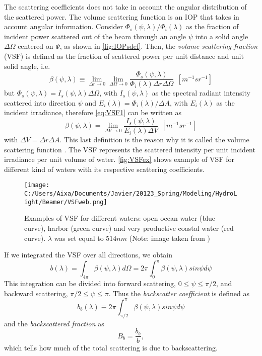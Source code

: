 The scattering coefficients does not take in account the angular distribution of the scattered power. The volume scattering function is an IOP that takes in account angular information. Consider $\Phi_s(\psi,\lambda)/\Phi_i(\lambda)$ as the fraction of incident power scattered out of the beam through an angle $\psi$ into a solid angle $\Delta\Omega$ centered on $\Psi$, as shown in \autoref{fig:IOPsdef}. Then, the {\it volume scattering fraction} (VSF)  is defined as the fraction of scattered power per unit distance and unit solid angle, i.e.
\begin{equation}\label{eq:VSF1}
  \beta(\psi,\lambda)\equiv \lim_{\Delta r\to 0} \lim_{\Delta \Omega\to 0}  \frac{\Phi_s(\psi,\lambda)}{\Phi_i(\lambda)\Delta r\Delta \Omega}~~\left[m^{-1}sr^{-1} \right]
\end{equation}
but $\Phi_s(\psi,\lambda)=I_s(\psi,\lambda)\Delta \Omega$, with $I_s(\psi,\lambda)$ as the spectral radiant intensity scattered into direction $\psi$ and $E_i(\lambda)=\Phi_i(\lambda)/\Delta A$, with $E_i(\lambda)$ as the incident irradiance, therefore \autoref{eq:VSF1} can be written as
\begin{equation} 
  \beta(\psi,\lambda)= \lim_{\Delta V\to 0} \frac{I_s(\psi,\lambda)}{E_i(\lambda)\Delta V}~~\left[m^{-1}sr^{-1} \right]
\end{equation}
with $\Delta V=\Delta r\Delta A$. This last definition is the reason why it is called the volume scattering function \cite{Mobley:2001}. The VSF represents the scattered intensity per unit incident irradiance per unit volume of water. \autoref{fig:VSFex} shows example of VSF for different kind of waters with its respective scattering coefficients.

\begin{figure}[htb]
\centering
      \texttt{[image: C:/Users/Aixa/Documents/Javier/20123\_Spring/Modeling/HydroLight/Beamer/VSFweb.png]}
      \caption{Examples of VSF for different waters: open ocean water (blue curve), harbor (green curve) and very productive coastal water (red curve). $\lambda$ was set equal to $514nm$ (Note: image taken from \cite{Mobley:2001})}
      \label{fig:VSFex}
\end{figure}

If we integrated the VSF over all directions, we obtain
\begin{equation}
  b(\lambda)=\int_{4\pi} \beta(\psi,\lambda)d\Omega=2\pi\int_0^\pi \beta(\psi,\lambda)sin\psi d\psi
\end{equation}
This integration can be divided into forward scattering, $0\leq\psi\leq\pi/2$, and backward scattering, $\pi/2\leq\psi\leq\pi$. Thus the {\it backscatter coefficient}  is defined as
\begin{equation}
  b_b(\lambda)\equiv 2\pi\int_{\pi/2}^\pi \beta(\psi,\lambda)sin\psi d\psi
\end{equation}
and the {\it backscattered fraction}  as 
\begin{equation}
  B_b=\frac{b_b}{b},
\end{equation}
which tells how much of the total scattering is due to backscattering.

